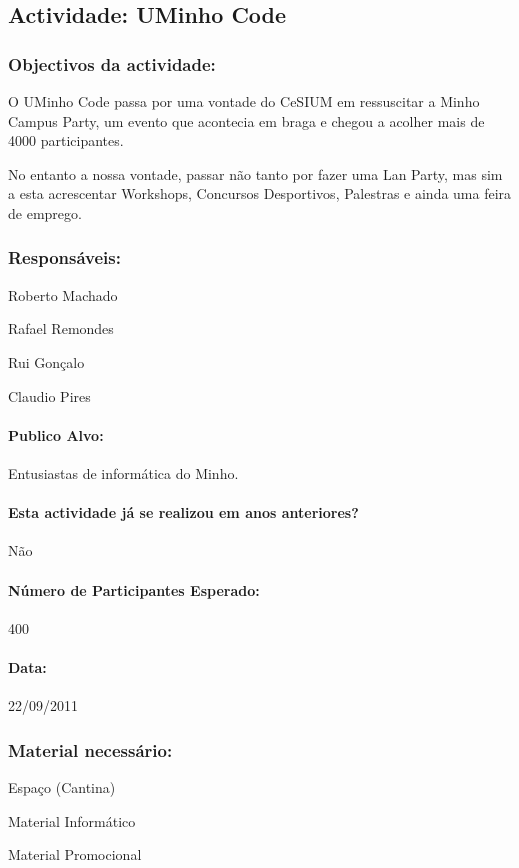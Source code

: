 \subsection{Actividade: UMinho Code} %

\subsubsection*{Objectivos da actividade:}
O UMinho Code passa por uma vontade do CeSIUM em ressuscitar a Minho Campus Party, um evento que acontecia em braga e chegou a acolher mais de 4000 participantes.

No entanto a nossa vontade, passar não tanto por fazer uma Lan Party, mas sim a esta acrescentar Workshops, Concursos Desportivos, Palestras e ainda uma feira de emprego.

\subsubsection*{Responsáveis:}
\begin{itemizedash}
	\item{Roberto Machado}
	\item{Rafael Remondes}
	\item{Rui Gonçalo}
	\item{Claudio Pires}
\end{itemizedash}

\paragraph{Publico Alvo: }
Entusiastas de informática do Minho.

\paragraph{Esta actividade já se realizou em anos anteriores?}
Não
\paragraph{Número de Participantes Esperado:}
400
\paragraph{Data:} 22/09/2011

\subsubsection*{Material necessário:}
\begin{itemizedash}
	\item{Espaço (Cantina)}
	\item{Material Informático}
	\item{Material Promocional}
	
\end{itemizedash}


